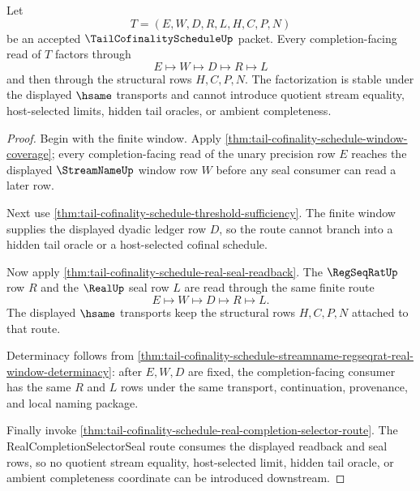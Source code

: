 \begin{theorem}
\label{thm:tail-cofinality-schedule-window-seal-factorization}
Let
$$
T=(E,W,D,R,L,H,C,P,N)
$$
be an accepted $\TailCofinalityScheduleUp$ packet. Every completion-facing read of $T$ factors through
$$
E \longmapsto W \longmapsto D \longmapsto R \longmapsto L
$$
and then through the structural rows $H,C,P,N$. The factorization is stable under the displayed $\hsame$ transports and cannot introduce quotient stream equality, host-selected limits, hidden tail oracles, or ambient completeness.
\end{theorem}
\begin{proof}
Begin with the finite window. Apply \autoref{thm:tail-cofinality-schedule-window-coverage}; every completion-facing read of the unary precision row $E$ reaches the displayed $\StreamNameUp$ window row $W$ before any seal consumer can read a later row.

Next use \autoref{thm:tail-cofinality-schedule-threshold-sufficiency}. The finite window supplies the displayed dyadic ledger row $D$, so the route cannot branch into a hidden tail oracle or a host-selected cofinal schedule.

Now apply \autoref{thm:tail-cofinality-schedule-real-seal-readback}. The $\RegSeqRatUp$ row $R$ and the $\RealUp$ seal row $L$ are read through the same finite route
$$
E \longmapsto W \longmapsto D \longmapsto R \longmapsto L.
$$
The displayed $\hsame$ transports keep the structural rows $H,C,P,N$ attached to that route.

Determinacy follows from \autoref{thm:tail-cofinality-schedule-streamname-regseqrat-real-window-determinacy}: after $E,W,D$ are fixed, the completion-facing consumer has the same $R$ and $L$ rows under the same transport, continuation, provenance, and local naming package.

Finally invoke \autoref{thm:tail-cofinality-schedule-real-completion-selector-route}. The RealCompletionSelectorSeal route consumes the displayed readback and seal rows, so no quotient stream equality, host-selected limit, hidden tail oracle, or ambient completeness coordinate can be introduced downstream.
\end{proof}

